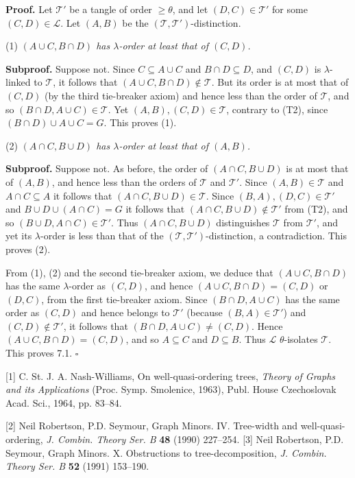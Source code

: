 \textbf{Proof.} Let $\mathscr{T}'$ be a tangle of order $\ge \theta$, and let $(D, C) \in \mathscr{T}'$ for some $(C, D) \in \mathscr{L}$. Let $(A, B)$ be the $(\mathscr{T}, \mathscr{T}')$-distinction.

\hspace*{12pt}(1) \textit{$(A \cup C, B \cap D)$ has $\lambda$-order at least that of $(C, D)$.}

\textbf{Subproof.} Suppose not. Since $C \subseteq A \cup C$ and $B \cap D \subseteq D$, and $(C, D)$ is $\lambda$-linked to $\mathscr{T}$, it follows that $(A \cup C, B \cap D) \notin \mathscr{T}$. But its order is at most that of $(C, D)$ (by the third tie-breaker axiom) and hence less than the order of $\mathscr{T}$, and so $(B \cap D, A \cup C) \in \mathscr{T}$. Yet $(A, B), (C, D) \in \mathscr{T}$, contrary to (T2), since $(B \cap D) \cup A \cup C = G$. This proves (1).

\hspace*{12pt}(2) \textit{$(A \cap C, B \cup D)$ has $\lambda$-order at least that of $(A, B)$.}

\textbf{Subproof.} Suppose not. As before, the order of $(A \cap C, B \cup D)$ is at most that of $(A, B)$, and hence less than the orders of $\mathscr{T}$ and $\mathscr{T}'$. Since $(A, B) \in \mathscr{T}$ and $A \cap C \subseteq A$ it follows that $(A \cap C, B \cup D) \in \mathscr{T}$. Since $(B, A), (D, C) \in \mathscr{T}'$ and $B \cup D \cup (A \cap C) = G$ it follows that $(A \cap C, B \cup D) \notin \mathscr{T}'$ from (T2), and so $(B \cup D, A \cap C) \in \mathscr{T}'$. Thus $(A \cap C, B \cup D)$ distinguishes $\mathscr{T}$ from $\mathscr{T}'$, and yet its $\lambda$-order is less than that of the $(\mathscr{T}, \mathscr{T}')$-distinction, a contradiction. This proves (2).

From (1), (2) and the second tie-breaker axiom, we deduce that $(A \cup C, B \cap D)$ has the same $\lambda$-order as $(C, D)$, and hence $(A \cup C, B \cap D) = (C, D)$ or $(D, C)$, from the first tie-breaker axiom. Since $(B \cap D, A \cup C)$ has the same order as $(C, D)$ and hence belongs to $\mathscr{T}'$ (because $(B, A) \in \mathscr{T}'$) and $(C, D) \notin \mathscr{T}'$, it follows that $(B \cap D, A \cup C) \ne (C, D)$. Hence $(A \cup C, B \cap D) = (C, D)$, and so $A \subseteq C$ and $D \subseteq B$. Thus $\mathscr{L}$ $\theta$-isolates $\mathscr{T}$. This proves 7.1. $\square$


[1] C. St. J. A. Nash-Williams, On well-quasi-ordering trees, \textit{Theory of Graphs and its Applications} (Proc. Symp. Smolenice, 1963), Publ. House Czechoslovak Acad. Sci., 1964, pp. 83--84.

[2] Neil Robertson, P.D. Seymour, Graph Minors. IV. Tree-width and well-quasi-ordering, \textit{J. Combin. Theory Ser. B} \textbf{48} (1990) 227--254. [3] Neil Robertson, P.D. Seymour, Graph Minors. X. Obstructions to tree-decomposition, \textit{J. Combin. Theory Ser. B} \textbf{52} (1991) 153--190.
